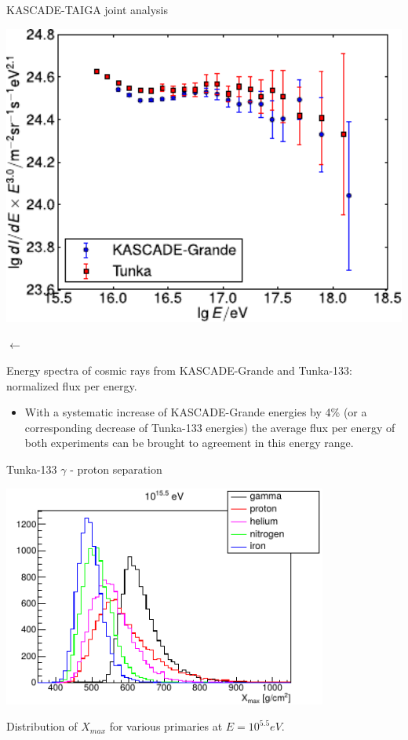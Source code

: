 \begin{frame}{KASCADE-TAIGA joint analysis}
\small
\begin{center}
    \begin{minipage}{0.55\textwidth}
     	\includegraphics[width=1\textwidth]{pics/KG_tunka133_scales.pdf}
    \end{minipage}
     $\longleftarrow$ 
\begin{minipage}{0.38\textwidth}	
  Energy spectra of cosmic rays from KASCADE-Grande and Tunka-133: normalized flux per energy.
      \end{minipage}
   
\end{center}

\begin{itemize}
 \item  With a systematic increase of
KASCADE-Grande energies by 4\% (or a corresponding decrease of Tunka-133 energies) 
the average flux per energy of both experiments can be brought to agreement
in this energy range.
\end{itemize}
\end{frame}

\begin{frame}{Tunka-133 $\gamma$ - proton separation}
    \begin{center}
	\includegraphics[width=0.8\textwidth]{pics/tunka_gamma_cr_diff.pdf}
	
      Distribution of $X_{max}$ for various primaries at $E = 10^{5.5} eV$.
    \end{center}
\end{frame}

